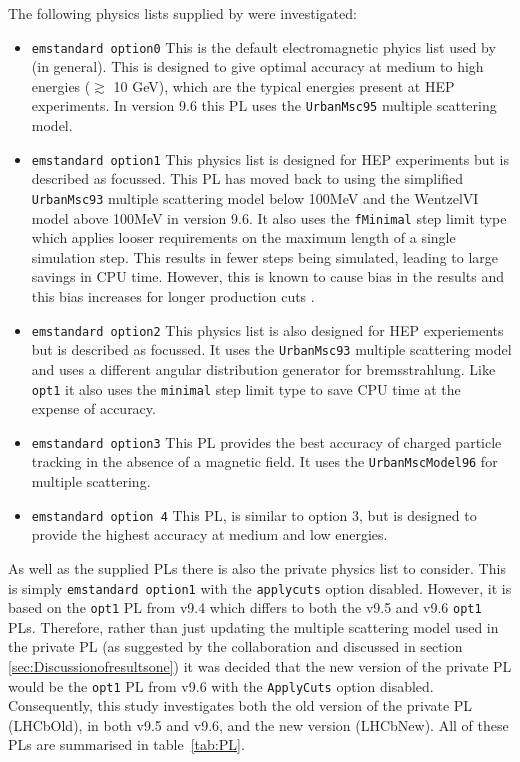 The following physics lists supplied by \geant were investigated:
\begin{itemize}
\item \texttt{emstandard option0}
  This is the default electromagnetic phyics list used by \geant (in general).  This is designed to give optimal accuracy at medium to high energies ($\gtrsim$ 10 GeV), which are the typical energies present at HEP experiments.  In version 9.6 this PL uses the \texttt{UrbanMsc95} multiple scattering model.
\item \texttt{emstandard option1}
  This physics list is designed for HEP experiments but is described as \cms focussed. This PL has moved back to using the simplified \texttt{UrbanMsc93} multiple scattering model below 100MeV and the WentzelVI model above 100MeV in version 9.6.  It also uses the \texttt{fMinimal} step limit type which applies looser requirements on the maximum length of a single simulation step.  This results in fewer steps being simulated, leading to large savings in CPU time.  However, this is known to cause bias in the results and this bias increases for longer production cuts \cite{1742-6596-219-3-032045}.
\item \texttt{emstandard option2}
  This physics list is also designed for HEP experiements but is described as \lhcb focussed.  It uses the \texttt{UrbanMsc93} multiple scattering model and uses a different angular distribution generator for bremsstrahlung.  Like \texttt{opt1} it also uses the \texttt{minimal} step limit type to save CPU time at the expense of accuracy.
\item \texttt{emstandard option3}
  This PL provides the best accuracy of charged particle tracking in the absence of a magnetic field.  It uses the \texttt{UrbanMscModel96} for multiple scattering.
\item \texttt{emstandard option 4}
  This PL, is similar to option 3, but is designed to provide the highest accuracy at medium and low energies.
\end{itemize}

As well as the \geant supplied PLs there is also the \lhcb private physics list to consider.  This is simply \texttt{emstandard option1} with the \texttt{applycuts} option disabled.  However, it is based on the \texttt{opt1} PL from \geant v9.4 which differs to both the v9.5 and v9.6 \texttt{opt1} PLs.  Therefore, rather than just updating the multiple scattering model used in the \lhcb private PL (as suggested by the \geant collaboration  and discussed in section \ref{sec:Discussionofresultsone}) it was decided that the new version of the \lhcb private PL would be the \texttt{opt1} PL from v9.6 with the \texttt{ApplyCuts} option disabled. Consequently, this study investigates both the old version of the \lhcb private PL (LHCbOld), in both \geant v9.5 and \geant v9.6, and the new version (LHCbNew).  All of these PLs are summarised in table~\ref{tab:PL}.

